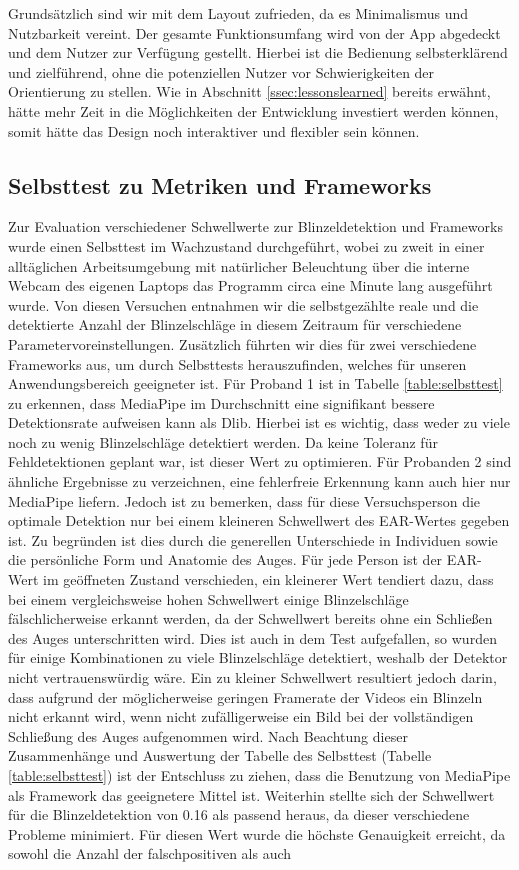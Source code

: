 Grundsätzlich sind wir mit dem Layout zufrieden, da es Minimalismus und Nutzbarkeit vereint. Der gesamte Funktionsumfang wird von der App abgedeckt und dem Nutzer zur Verfügung gestellt. Hierbei ist die Bedienung selbsterklärend und zielführend, ohne die potenziellen Nutzer vor Schwierigkeiten der Orientierung zu stellen. Wie in Abschnitt \ref{ssec:lessonslearned} bereits erwähnt, hätte mehr Zeit in die Möglichkeiten der Entwicklung investiert werden können, somit hätte das Design noch interaktiver und flexibler sein können.

\subsection{Selbsttest zu Metriken und Frameworks}
\label{subsec:selftest}
Zur Evaluation verschiedener Schwellwerte zur Blinzeldetektion und Frameworks wurde einen Selbsttest im Wachzustand durchgeführt, wobei zu zweit in einer alltäglichen Arbeitsumgebung mit natürlicher Beleuchtung über die interne Webcam des eigenen Laptops das Programm circa eine Minute lang ausgeführt wurde. Von diesen Versuchen entnahmen wir die selbstgezählte reale und die detektierte Anzahl der Blinzelschläge in diesem Zeitraum für verschiedene Parametervoreinstellungen. Zusätzlich führten wir dies für zwei verschiedene Frameworks aus, um durch Selbsttests herauszufinden, welches für unseren Anwendungsbereich geeigneter ist. Für Proband 1 ist in Tabelle \ref{table:selbsttest} zu erkennen, dass MediaPipe im Durchschnitt eine signifikant bessere Detektionsrate aufweisen kann als Dlib. Hierbei ist es wichtig, dass weder zu viele noch zu wenig Blinzelschläge detektiert werden. Da keine Toleranz für Fehldetektionen geplant war, ist dieser Wert zu optimieren. Für Probanden 2 sind ähnliche Ergebnisse zu verzeichnen, eine fehlerfreie Erkennung kann auch hier nur MediaPipe liefern. Jedoch ist zu bemerken, dass für diese Versuchsperson die optimale Detektion nur bei einem kleineren Schwellwert des EAR-Wertes gegeben ist. Zu begründen ist dies durch die generellen Unterschiede in Individuen sowie die persönliche Form und Anatomie des Auges. Für jede Person ist der EAR-Wert im geöffneten Zustand verschieden, ein kleinerer Wert tendiert dazu, dass bei einem vergleichsweise hohen Schwellwert einige Blinzelschläge fälschlicherweise erkannt werden, da der Schwellwert bereits ohne ein Schließen des Auges unterschritten wird. Dies ist auch in dem Test aufgefallen, so wurden für einige Kombinationen zu viele Blinzelschläge detektiert, weshalb der Detektor nicht vertrauenswürdig wäre. Ein zu kleiner Schwellwert resultiert jedoch darin, dass aufgrund der möglicherweise geringen Framerate der Videos ein Blinzeln nicht erkannt wird, wenn nicht zufälligerweise ein Bild bei der vollständigen Schließung des Auges aufgenommen wird. Nach Beachtung dieser Zusammenhänge und Auswertung der Tabelle des Selbsttest (Tabelle \ref{table:selbsttest}) ist der Entschluss zu ziehen, dass die Benutzung von MediaPipe als Framework das geeignetere Mittel ist. Weiterhin stellte sich der Schwellwert für die Blinzeldetektion von 0.16 als passend heraus, da dieser verschiedene Probleme minimiert. Für diesen Wert wurde die höchste Genauigkeit erreicht, da sowohl die Anzahl der falschpositiven als auch 